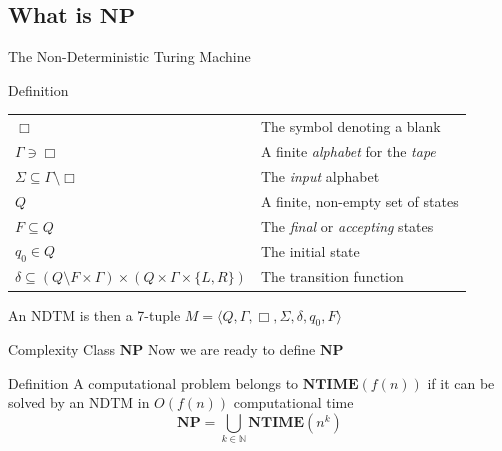 \documentclass[handout]{beamer}
\newcommand{\Natural}{\mathbb{N}}
\newcommand{\NPTIME}{\mathbf{NP}}
\newcommand{\NTIME}{\mathbf{NTIME}}
\begin{document}
  \subsection{What is $\NPTIME$}
  \begin{frame}{The Non-Deterministic Turing Machine}
      \begin{block}{Definition}
          \pause
          \begin{table}[]
              \centering
              \begin{tabular}{ll}
                  $\Box$ & The symbol denoting a blank \pause \\
                  $\Gamma \ni \Box$
                  & A finite \textit{alphabet} for the \textit{tape} \pause \\
                  $\Sigma \subseteq \Gamma \setminus \Box$ 
                  & The \textit{input} alphabet \pause \\
                  $Q$ & A finite, non-empty set of states \pause \\
                  $F \subseteq Q$
                  & The \textit{final} or \textit{accepting} states \pause \\
                  $q_0 \in Q$ & The initial state \pause \\
                  $\delta \subseteq (Q \setminus F \times \Gamma ) \times (Q
                  \times \Gamma \times \{L, R\})$ & The transition function
              \end{tabular}
          \end{table}
          \pause
          An NDTM is then a 7-tuple
          $M = \langle Q, \Gamma, \Box, \Sigma, \delta, q_0, F \rangle$
      \end{block}
  \end{frame}
  \begin{frame}{Complexity Class $\NPTIME$}
      Now we are ready to define $\NPTIME$
      \pause
      \begin{block}{Definition}
          A computational problem belongs to
              $\NTIME\left(f(n)\right)$ if it can be solved by an
              NDTM in $O(f(n))$ computational time 
              \pause
          $$\NPTIME = \bigcup_{k \in \Natural}
              \NTIME\left(n^k\right)$$
      \end{block}
  \end{frame}
\end{document}
